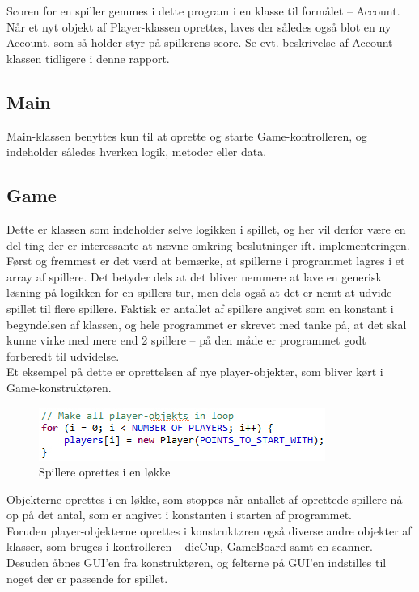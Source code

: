 Scoren for en spiller gemmes i dette program i en klasse til formålet – Account. Når et nyt objekt af Player-klassen oprettes, laves der således også blot en ny Account, som så holder styr på spillerens score. Se evt. beskrivelse af Account-klassen tidligere i denne rapport.
\subsection{Main}
Main-klassen benyttes kun til at oprette og starte Game-kontrolleren, og indeholder således hverken logik, metoder eller data.
\subsection{Game}
Dette er klassen som indeholder selve logikken i spillet, og her vil derfor være en del ting der er interessante at nævne omkring beslutninger ift. implementeringen.
\\

Først og fremmest er det værd at bemærke, at spillerne i programmet lagres i et array af spillere. Det betyder dels at det bliver nemmere at lave en generisk løsning på logikken for en spillers tur, men dels også at det er nemt at udvide spillet til flere spillere. Faktisk er antallet af spillere angivet som en konstant i begyndelsen af klassen, og hele programmet er skrevet med tanke på, at det skal kunne virke med mere end 2 spillere – på den måde er programmet godt forberedt til udvidelse.
\\


Et eksempel på dette er oprettelsen af nye player-objekter, som bliver kørt i Game-konstruktøren.
\begin{figure}[!ht]
\centering
\includegraphics[scale=0.4]{Game-illustration1.jpg}
\caption[<Text for the list of figures>]{Spillere oprettes i en løkke}
\label{fig:figure 2} 
\end{figure}
Objekterne oprettes i en løkke, som stoppes når antallet af oprettede spillere nå op på det antal, som er angivet i konstanten i starten af programmet.
\\

Foruden player-objekterne oprettes i konstruktøren også diverse andre objekter af klasser, som bruges i kontrolleren – dieCup, GameBoard samt en scanner. Desuden åbnes GUI’en fra konstruktøren, og felterne på GUI’en indstilles til noget der er passende for spillet.
\\

